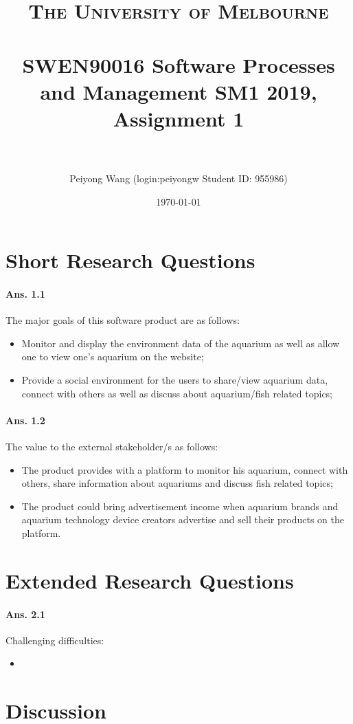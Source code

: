 \documentclass[paper=a4, fontsize=11pt]{scrartcl} %
\title{	
\normalfont \normalsize 
\textsc{The University of Melbourne } \\ [25pt] %
\horrule{0.5pt} \\[0.4cm] %
\huge SWEN90016 Software Processes and Management SM1 2019,
Assignment 1 \\ %
\horrule{2pt} \\[0.5cm] %
}
\author{Peiyong Wang   (login:peiyongw \; Student ID: 955986)} %
\date{\normalsize\today} %
\numberwithin{equation}{section} %
\numberwithin{figure}{section} %
\numberwithin{table}{section} %
\begin{document}
\maketitle %


\section{Short Research Questions}

\paragraph{Ans. 1.1}

The major goals of this software product are as follows:

\begin{itemize}
	\item Monitor and display the environment data of the aquarium as well as allow one to view one's aquarium on the website;
	\item Provide a social environment for the users to share/view aquarium data, connect with others as well as discuss about aquarium/fish related topics;
\end{itemize}

\paragraph{Ans. 1.2}
The value to the external stakeholder/s as follows:
\begin{itemize}
	\item The product provides with a platform to monitor his aquarium, connect with others, share information about aquariums and discuss fish related topics;
	\item The product could bring advertisement income when aquarium brands and aquarium technology device creators advertise and sell their products on the platform. 
\end{itemize}




\section{Extended Research Questions}
\paragraph{Ans. 2.1}
Challenging difficulties:
\begin{itemize}
	\item 
\end{itemize}

\section{Discussion}























\end{document}
